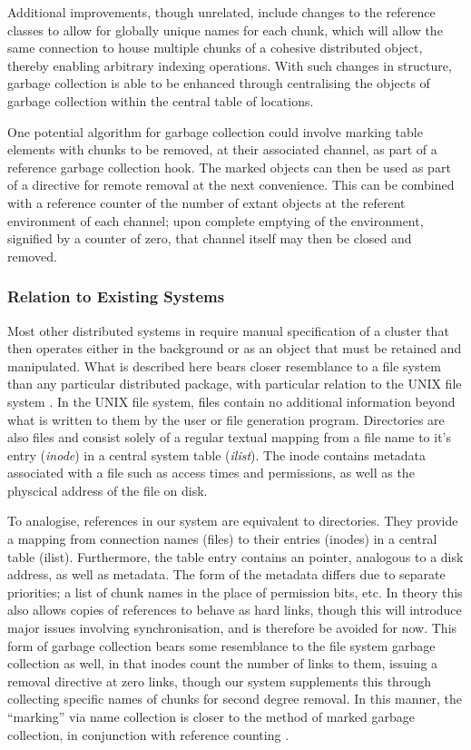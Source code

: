 Additional improvements, though unrelated, include changes to the
reference classes to allow for globally unique names for each chunk,
which will allow the same connection to house multiple chunks of a
cohesive distributed object, thereby enabling arbitrary indexing
operations. With such changes in structure, garbage collection is able
to be enhanced through centralising the objects of garbage collection
within the central table of locations.

One potential algorithm for garbage collection could involve marking
table elements with chunks to be removed, at their associated channel,
as part of a reference garbage collection hook. The marked objects can
then be used as part of a directive for remote removal at the next
convenience. This can be combined with a reference counter of the number
of extant objects at the referent environment of each channel; upon
complete emptying of the environment, signified by a counter of zero,
that channel itself may then be closed and removed.

\subsubsection{Relation to Existing Systems}\label{sec:localrel}

Most other distributed systems in \R require manual specification of a
cluster that then operates either in the background or as an object that
must be retained and manipulated. What is described here bears closer
resemblance to a file system than any particular distributed \R package,
with particular relation to the UNIX file system
\cites{ritchie1979evolution,thompson1974unix}. In the UNIX
file system, files contain no additional information beyond what is
written to them by the user or file generation program. Directories are
also files and consist solely of a regular textual mapping from a file
name to it's entry (\emph{inode}) in a central system table
(\emph{ilist}). The inode contains metadata associated with a file such
as access times and permissions, as well as the physcical address of the
file on disk.

To analogise, references in our system are equivalent to directories.
They provide a mapping from connection names (files) to their entries
(inodes) in a central table (ilist). Furthermore, the table entry
contains an  pointer, analogous to a disk address, as
well as metadata. The form of the metadata differs due to separate
priorities; a list of chunk names in the place of permission bits, etc.
In theory this also allows copies of references to behave as hard links,
though this will introduce major issues involving synchronisation, and
is therefore be avoided for now. This form of garbage collection bears
some resemblance to the file system garbage collection as well, in that
inodes count the number of links to them, issuing a removal directive at
zero links, though our system supplements this through collecting
specific names of chunks for second degree removal. In this manner, the
``marking'' via name collection is closer to the method of marked
garbage collection, in conjunction with reference counting
\cite{knuth1}.

